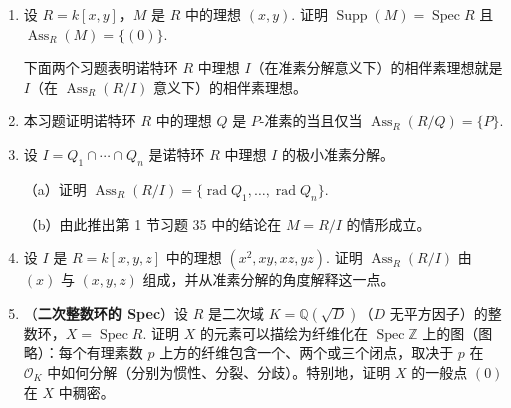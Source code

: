 \begin{enumerate}
\item 设 \(R = k[x,y]\)，\(M\) 是 \(R\) 中的理想 \((x,y)\). 证明 \(\operatorname{Supp}(M) = \operatorname{Spec}R\) 且 \(\operatorname{Ass}_R(M) = \{(0)\}\).

\noindent 下面两个习题表明诺特环 \(R\) 中理想 \(I\)（在准素分解意义下）的相伴素理想就是 \(I\)（在 \(\operatorname{Ass}_R(R/I)\) 意义下）的相伴素理想。

\item 本习题证明诺特环 \(R\) 中的理想 \(Q\) 是 \(P\)-准素的当且仅当 \(\operatorname{Ass}_R(R/Q) = \{P\}\).

\item 设 \(I = Q_1 \cap \cdots \cap Q_n\) 是诺特环 \(R\) 中理想 \(I\) 的极小准素分解。

（a）证明 \(\operatorname{Ass}_R(R/I) = \{\operatorname{rad}Q_1, \ldots, \operatorname{rad}Q_n\}\).

（b）由此推出第 1 节习题 35 中的结论在 \(M = R/I\) 的情形成立。

\item 设 \(I\) 是 \(R = k[x,y,z]\) 中的理想 \((x^2, xy, xz, yz)\). 证明 \(\operatorname{Ass}_R(R/I)\) 由 \((x)\) 与 \((x,y,z)\) 组成，并从准素分解的角度解释这一点。

\item （\textbf{二次整数环的 Spec}）设 \(R\) 是二次域 \(K = \mathbb{Q}(\sqrt{D})\)（\(D\) 无平方因子）的整数环，\(X = \operatorname{Spec}R\). 证明 \(X\) 的元素可以描绘为纤维化在 \(\operatorname{Spec}\mathbb{Z}\) 上的图（图略）：每个有理素数 \(p\) 上方的纤维包含一个、两个或三个闭点，取决于 \(p\) 在 \(\mathcal{O}_K\) 中如何分解（分别为惯性、分裂、分歧）。特别地，证明 \(X\) 的一般点 \((0)\) 在 \(X\) 中稠密。
\end{enumerate}

